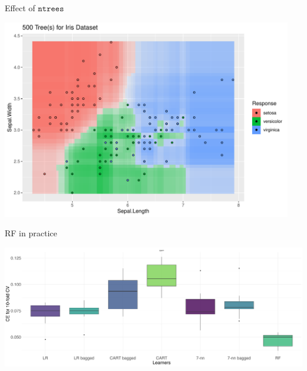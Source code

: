 \documentclass[11pt,compress,t,notes=noshow, xcolor=table]{beamer}
\begin{document}
\begin{vbframe}{Effect of $\texttt{ntrees}$}
\begin{knitrout}
{\centering \includegraphics[width=0.95\textwidth]{figure/cart_forest_intro_3} 

}
\end{knitrout}
\end{vbframe}

\begin{vbframe}{RF in practice}
\begin{center}
\includegraphics[width=1\textwidth]{figure/bagging-bench_RF.png}
\end{center}
\end{vbframe}

\endlecture
\end{document}
